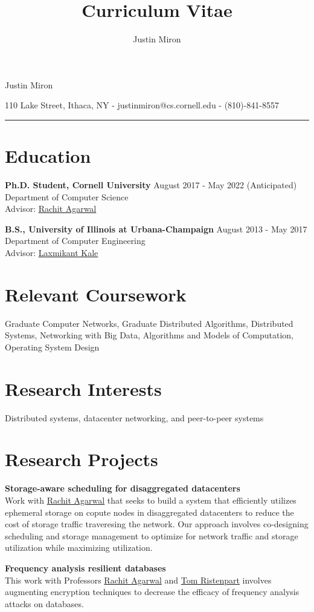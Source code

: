 \documentclass[10pt]{article}
\title{Curriculum Vitae}
\author{Justin Miron}
\makeatletter
\newcommand{\Hrule}{\par\rule{\linewidth}{0.3mm}}
\newcommand{\leftrightrow}[2]{
	#1 \hfill #2 \\
}
\newcommand{\titlesection}{
\parindent=0pt
\setlength{\parskip}{0.1em}
\par{\LARGE Justin Miron}
\par{110 Lake Street, Ithaca, NY -  justinmiron@cs.cornell.edu - (810)-841-8557}
\vspace{-0.5em}
\Hrule
}
\newcommand{\researchblock}[3]{
	\leftrightrow{\textbf{#1}}{#2}#3
}
\newcommand{\educationblock}[3]{
	\leftrightrow{\textbf{#1}}{#2}
    #3 \\
}
\makeatother
\begin{document}
\titlesection
\setlength{\parskip}{0em}

\section{Education}
\vspace{0.1em}
\educationblock{Ph.D. Student, Cornell University}{August 2017 - May 2022 (Anticipated)}{Department of Computer Science}
Advisor: \href{http://www.cs.cornell.edu/~ragarwal/}{Rachit Agarwal}
\vspace{0.5em}

\educationblock{B.S., University of Illinois at Urbana-Champaign}{August 2013 - May 2017}{Department of Computer Engineering}
Advisor: \href{http://charm.cs.uiuc.edu/~kale/}{Laxmikant Kale}

\section{Relevant Coursework}
\vspace{0.1em}
Graduate Computer Networks, Graduate Distributed Algorithms, Distributed Systems, Networking with Big Data, Algorithms and Models of Computation, Operating System Design

\section{Research Interests}
\vspace{0.1em}
Distributed systems, datacenter networking, and peer-to-peer systems

\section{Research Projects}
\vspace{0.1em}
\researchblock{Storage-aware scheduling for disaggregated datacenters}{}
{
	Work with \href{http://www.cs.cornell.edu/~ragarwal/}{Rachit Agarwal} that seeks to build a system that efficiently utilizes ephemeral storage on copute nodes in disaggregated datacenters to reduce the cost of storage traffic traveresing the network. Our approach involves co-designing scheduling and storage management to optimize for network traffic and storage utilization while maximizing utilization.
}

\vspace{0.6em}

\researchblock{Frequency analysis resilient databases}{}
{
	This work with Professors \href{http://www.cs.cornell.edu/~ragarwal/}{Rachit Agarwal}  and \href{https://rist.tech.cornell.edu/}{Tom Ristenpart} involves augmenting encryption techniques to decrease the efficacy of frequency analysis attacks on databases.
}
\end{document}

